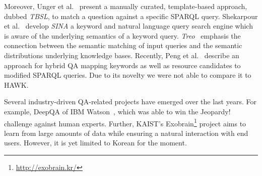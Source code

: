 Moreover, Unger et al.~\cite{template} present a manually curated, template-based approach, dubbed \emph{TBSL}, to match a question against a specific SPARQL query. 
{Shekarpour et al.~\cite{SINA_WebSemantic}} develop \emph{SINA} a keyword and natural language query search engine which is aware of the underlying semantics of a keyword query. 
\emph{Treo}~\cite{treo} emphasis the connection between the semantic matching of input queries and the semantic distributions underlying knowledge bases.
Recently, Peng et al.~\cite{DBLP:journals/corr/PengZZ14} describe an approach for hybrid QA mapping keywords as well as resource candidates to modified SPARQL queries. Due to its novelty we were not able to compare it to HAWK.

Several industry-driven QA-related projects have emerged over the last years. 
For example, DeepQA of IBM Watson~\cite{watson}, which was able to win the Jeopardy! challenge against human experts. 
Further, {KAIST's Exobrain\footnote{\url{http://exobrain.kr/}}} project aims to learn from large amounts of data while ensuring a natural interaction with end users. 
However, it is yet limited to Korean for the moment. %

